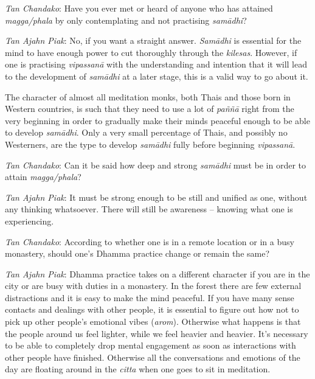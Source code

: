 \emph{Tan Chandako}: Have you ever met or heard of anyone who has
attained \emph{magga/phala} by only contemplating and not practising
\emph{samādhi}?

\emph{Tan Ajahn Piak}: No, if you want a straight answer. \emph{Samādhi}
is essential for the mind to have enough power to cut thoroughly through
the \emph{kilesas}. However, if one is practising \emph{vipassanā} with
the understanding and intention that it will lead to the development of
\emph{samādhi} at a later stage, this is a valid way to go about it.

The character of almost all meditation monks, both Thais and those born
in Western countries, is such that they need to use a lot of
\emph{paññā} right from the very beginning in order to gradually make
their minds peaceful enough to be able to develop \emph{samādhi}. Only a
very small percentage of Thais, and possibly no Westerners, are the type
to develop \emph{samādhi} fully before beginning \emph{vipassanā}.

\emph{Tan Chandako}: Can it be said how deep and strong \emph{samādhi}
must be in order to attain \emph{magga/phala}?

\emph{Tan Ajahn Piak}: It must be strong enough to be still and unified
as one, without any thinking whatsoever. There will still be awareness
-- knowing what one is experiencing.

\emph{Tan Chandako}: According to whether one is in a remote location or
in a busy monastery, should one's Dhamma practice change or remain the
same?

\emph{Tan Ajahn Piak}: Dhamma practice takes on a different character if
you are in the city or are busy with duties in a monastery. In the
forest there are few external distractions and it is easy to make the
mind peaceful. If you have many sense contacts and dealings with other
people, it is essential to figure out how not to pick up other people's
emotional vibes (\emph{arom}). Otherwise what happens is that the people
around us feel lighter, while we feel heavier and heavier. It's
necessary to be able to completely drop mental engagement as soon as
interactions with other people have finished. Otherwise all the
conversations and emotions of the day are floating around in the
\emph{citta} when one goes to sit in meditation.

